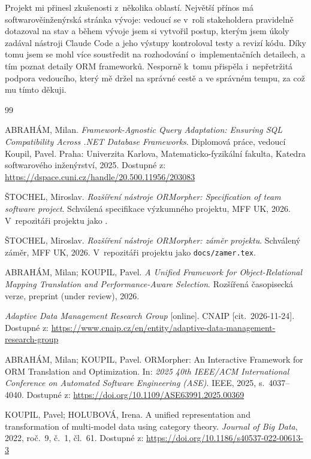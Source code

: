 Projekt mi přinesl zkušenosti z~několika oblastí. Největší přínos má softwarověinženýrská stránka vývoje: vedoucí se v~roli stakeholdera pravidelně dotazoval na stav a během vývoje jsem si vytvořil postup, kterým jsem úkoly zadával nástroji Claude Code a jeho výstupy kontroloval testy a revizí kódu. Díky tomu jsem se mohl více soustředit na rozhodování o~implementačních detailech, a tím poznat detaily ORM frameworků. Nesporně k~tomu přispěla i~nepřetržitá podpora vedoucího, který mě držel na správné cestě a ve správném tempu, za což mu tímto děkuji.

\begin{thebibliography}{99}

ABRAHÁM, Milan. \emph{Framework-Agnostic Query Adaptation: Ensuring SQL Compatibility Across .NET Database Frameworks}. Diplomová práce, vedoucí Koupil, Pavel. Praha: Univerzita Karlova, Matematicko-fyzikální fakulta, Katedra softwarového inženýrství, 2025. Dostupné z: \url{https://dspace.cuni.cz/handle/20.500.11956/203083}

ŠTOCHEL, Miroslav. \emph{Rozšíření nástroje ORMorpher: Specification of team software project}. Schválená specifikace výzkumného projektu, MFF UK, 2026. V~repozitáři projektu jako .

ŠTOCHEL, Miroslav. \emph{Rozšíření nástroje ORMorpher: záměr projektu}. Schválený záměr, MFF UK, 2026. V~repozitáři projektu jako \texttt{docs/zamer.tex}.

ABRAHÁM, Milan; KOUPIL, Pavel. \emph{A Unified Framework for Object-Relational Mapping Translation and Performance-Aware Selection}. Rozšířená časopisecká verze, preprint (under review), 2026.

\emph{Adaptive Data Management Research Group} [online]. CNAIP [cit.~\mbox{2026-11-24}]. Dostupné z: \url{https://www.cnaip.cz/en/entity/adaptive-data-management-research-group}

ABRAHÁM, Milan; KOUPIL, Pavel. ORMorpher: An Interactive Framework for ORM Translation and Optimization. In: \emph{2025 40th IEEE/ACM International Conference on Automated Software Engineering (ASE)}. IEEE, 2025, s.~4037--4040. Dostupné z: \url{https://doi.org/10.1109/ASE63991.2025.00369}

KOUPIL, Pavel; HOLUBOVÁ, Irena. A unified representation and transformation of multi-model data using category theory. \emph{Journal of Big Data}, 2022, roč.~9, č.~1, čl.~61. Dostupné z: \url{https://doi.org/10.1186/s40537-022-00613-3}


\end{thebibliography}

